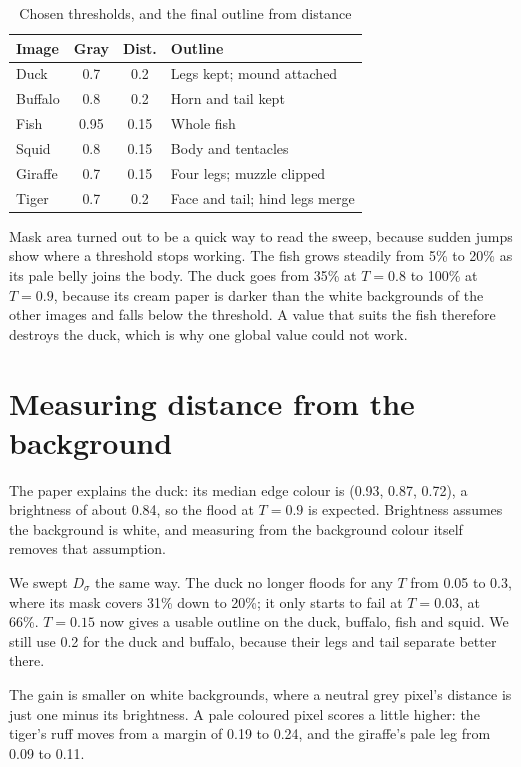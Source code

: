 \documentclass[conference]{IEEEtran}
\begin{document}
\begin{table}[t]
\caption{Chosen thresholds, and the final outline from distance}
\begin{center}
\begin{tabular}{|l|c|c|l|}
\hline
\textbf{Image} & \textbf{Gray} & \textbf{Dist.} & \textbf{Outline} \\
\hline
Duck & 0.7 & 0.2 & Legs kept; mound attached \\
Buffalo & 0.8 & 0.2 & Horn and tail kept \\
Fish & 0.95 & 0.15 & Whole fish \\
Squid & 0.8 & 0.15 & Body and tentacles \\
Giraffe & 0.7 & 0.15 & Four legs; muzzle clipped \\
Tiger & 0.7 & 0.2 & Face and tail; hind legs merge \\
\hline
\end{tabular}
\label{tab:thresholds}
\end{center}
\end{table}

Mask area turned out to be a quick way to read the sweep, because sudden jumps show where a threshold stops working. The fish grows steadily from 5\% to 20\% as its pale belly joins the body. The duck goes from 35\% at $T=0.8$ to 100\% at $T=0.9$, because its cream paper is darker than the white backgrounds of the other images and falls below the threshold. A value that suits the fish therefore destroys the duck, which is why one global value could not work.

\section{Measuring distance from the background}
\label{sec:distance}
The paper explains the duck: its median edge colour is (0.93, 0.87, 0.72), a brightness of about 0.84, so the flood at $T=0.9$ is expected. Brightness assumes the background is white, and measuring from the background colour itself removes that assumption.

We swept $D_\sigma$ the same way. The duck no longer floods for any $T$ from 0.05 to 0.3, where its mask covers 31\% down to 20\%; it only starts to fail at $T=0.03$, at 66\%. $T=0.15$ now gives a usable outline on the duck, buffalo, fish and squid. We still use 0.2 for the duck and buffalo, because their legs and tail separate better there.

The gain is smaller on white backgrounds, where a neutral grey pixel's distance is just one minus its brightness. A pale coloured pixel scores a little higher: the tiger's ruff moves from a margin of 0.19 to 0.24, and the giraffe's pale leg from 0.09 to 0.11.
\end{document}
